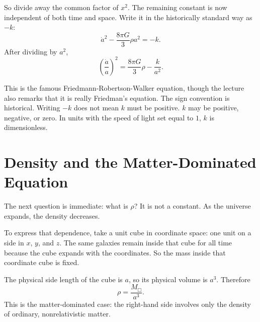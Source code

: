 So divide away the common factor of \(x^2\). The remaining constant is now independent of both time and space. Write it in the historically standard way as \(-k\):
\begin{equation}
\dot a^2-\frac{8\pi G}{3}\rho a^2=-k.
\end{equation}
After dividing by \(a^2\),
\begin{equation}
\left(\frac{\dot a}{a}\right)^2=\frac{8\pi G}{3}\rho-\frac{k}{a^2}.
\end{equation}

This is the famous Friedmann-Robertson-Walker equation, though the lecture also remarks that it is really Friedman's equation. The sign convention is historical. Writing \(-k\) does not mean \(k\) must be positive. \(k\) may be positive, negative, or zero. In units with the speed of light set equal to \(1\), \(k\) is dimensionless.

\section{Density and the Matter-Dominated Equation}

The next question is immediate: what is \(\rho\)? It is not a constant. As the universe expands, the density decreases.

To express that dependence, take a unit cube in coordinate space: one unit on a side in \(x\), \(y\), and \(z\). The same galaxies remain inside that cube for all time because the cube expands with the coordinates. So the mass inside that coordinate cube is fixed.


The physical side length of the cube is \(a\), so its physical volume is \(a^3\). Therefore
\begin{equation}
\rho=\frac{M_{\Box}}{a^3}.
\end{equation}
This is the matter-dominated case: the right-hand side involves only the density of ordinary, nonrelativistic matter.

\begin{classroomqa}
\end{classroomqa}

